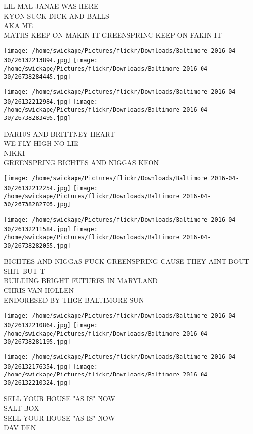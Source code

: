 \documentclass[10pt,letterpaper]{article}
\begin{document}
LIL MAL JANAE WAS HERE\\
KYON SUCK DICK AND BALLS\\
AKA ME\\
MATHS KEEP ON MAKIN IT GREENSPRING KEEP ON FAKIN IT\\
\pagebreak

\texttt{[image: /home/swickape/Pictures/flickr/Downloads/Baltimore 2016-04-30/26132213894.jpg]}
\texttt{[image: /home/swickape/Pictures/flickr/Downloads/Baltimore 2016-04-30/26738284445.jpg]}

\texttt{[image: /home/swickape/Pictures/flickr/Downloads/Baltimore 2016-04-30/26132212984.jpg]}
\texttt{[image: /home/swickape/Pictures/flickr/Downloads/Baltimore 2016-04-30/26738283495.jpg]}

DARIUS AND BRITTNEY HEART\\
WE FLY HIGH NO LIE\\
NIKKI\\
GREENSPRING BICHTES AND NIGGAS KEON\\
\pagebreak

\texttt{[image: /home/swickape/Pictures/flickr/Downloads/Baltimore 2016-04-30/26132212254.jpg]}
\texttt{[image: /home/swickape/Pictures/flickr/Downloads/Baltimore 2016-04-30/26738282705.jpg]}

\texttt{[image: /home/swickape/Pictures/flickr/Downloads/Baltimore 2016-04-30/26132211584.jpg]}
\texttt{[image: /home/swickape/Pictures/flickr/Downloads/Baltimore 2016-04-30/26738282055.jpg]}

BICHTES AND NIGGAS FUCK GREENSPRING CAUSE THEY AINT BOUT SHIT BUT T\\
BUILDING BRIGHT FUTURES IN MARYLAND\\
CHRIS VAN HOLLEN\\
ENDORESED BY THGE BALTIMORE SUN\\
\pagebreak

\texttt{[image: /home/swickape/Pictures/flickr/Downloads/Baltimore 2016-04-30/26132210864.jpg]}
\texttt{[image: /home/swickape/Pictures/flickr/Downloads/Baltimore 2016-04-30/26738281195.jpg]}

\texttt{[image: /home/swickape/Pictures/flickr/Downloads/Baltimore 2016-04-30/26132176354.jpg]}
\texttt{[image: /home/swickape/Pictures/flickr/Downloads/Baltimore 2016-04-30/26132210324.jpg]}

SELL YOUR HOUSE "AS IS" NOW\\
SALT BOX\\
SELL YOUR HOUSE "AS IS" NOW\\
DAV DEN\\
\pagebreak
\end{document}
